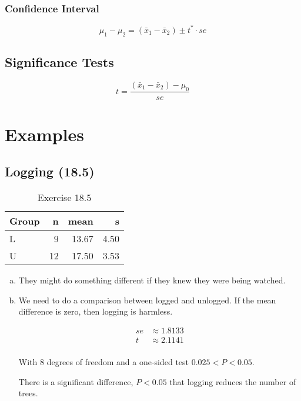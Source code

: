 \documentclass[letterpaper, landscape]{exam}
\begin{document}
  \subsubsection{Confidence Interval} %

  \[
    \mu_1 - \mu_2 = (\bar{x}_1 - \bar{x}_2) \pm t^* \cdot se 
  \]
  
  \subsection{Significance Tests} %
  
  \[
    t = \frac{(\bar{x}_1 - \bar{x}_2) - \mu_0}{se}
  \]
  
  \section{Examples} %

  \subsection{Logging (18.5)} %
  
  \begin{table}[ht]
    \centering
    \begin{tabular}{lrrr}
      \toprule
      Group & n  & mean  & s \\
      \midrule
      L     & 9  & 13.67 & 4.50 \\
      U     & 12 & 17.50 & 3.53 \\
      \bottomrule
    \end{tabular}
    \caption{Exercise 18.5}
  \end{table}

  \begin{enumerate}[(a)]
    \item They might do something different if they knew they were being watched.

    \item We need to do a comparison between logged and unlogged. If the mean
      difference is zero, then logging is harmless.


      \begin{align*}
        se & \approx 1.8133 \\
        t  & \approx 2.1141 \\
      \end{align*}

      With 8 degrees of freedom and a one-sided test $0.025 < P < 0.05$.

      There is a significant difference, $P < 0.05$ that logging reduces the number
      of trees.

  \end{enumerate}
\end{document}
